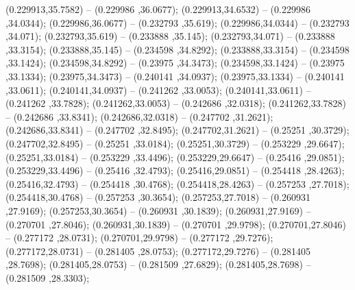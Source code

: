  (0.229913,35.7582) -- (0.229986 ,36.0677);
 (0.229913,34.6532) -- (0.229986 ,34.0344);
 (0.229986,36.0677) -- (0.232793 ,35.619);
 (0.229986,34.0344) -- (0.232793 ,34.071);
 (0.232793,35.619) -- (0.233888 ,35.145);
 (0.232793,34.071) -- (0.233888 ,33.3154);
 (0.233888,35.145) -- (0.234598 ,34.8292);
 (0.233888,33.3154) -- (0.234598 ,33.1424);
 (0.234598,34.8292) -- (0.23975 ,34.3473);
 (0.234598,33.1424) -- (0.23975 ,33.1334);
 (0.23975,34.3473) -- (0.240141 ,34.0937);
 (0.23975,33.1334) -- (0.240141 ,33.0611);
 (0.240141,34.0937) -- (0.241262 ,33.0053);
 (0.240141,33.0611) -- (0.241262 ,33.7828);
 (0.241262,33.0053) -- (0.242686 ,32.0318);
 (0.241262,33.7828) -- (0.242686 ,33.8341);
 (0.242686,32.0318) -- (0.247702 ,31.2621);
 (0.242686,33.8341) -- (0.247702 ,32.8495);
 (0.247702,31.2621) -- (0.25251 ,30.3729);
 (0.247702,32.8495) -- (0.25251 ,33.0184);
 (0.25251,30.3729) -- (0.253229 ,29.6647);
 (0.25251,33.0184) -- (0.253229 ,33.4496);
 (0.253229,29.6647) -- (0.25416 ,29.0851);
 (0.253229,33.4496) -- (0.25416 ,32.4793);
 (0.25416,29.0851) -- (0.254418 ,28.4263);
 (0.25416,32.4793) -- (0.254418 ,30.4768);
 (0.254418,28.4263) -- (0.257253 ,27.7018);
 (0.254418,30.4768) -- (0.257253 ,30.3654);
 (0.257253,27.7018) -- (0.260931 ,27.9169);
 (0.257253,30.3654) -- (0.260931 ,30.1839);
 (0.260931,27.9169) -- (0.270701 ,27.8046);
 (0.260931,30.1839) -- (0.270701 ,29.9798);
 (0.270701,27.8046) -- (0.277172 ,28.0731);
 (0.270701,29.9798) -- (0.277172 ,29.7276);
 (0.277172,28.0731) -- (0.281405 ,28.0753);
 (0.277172,29.7276) -- (0.281405 ,28.7698);
 (0.281405,28.0753) -- (0.281509 ,27.6829);
 (0.281405,28.7698) -- (0.281509 ,28.3303);
